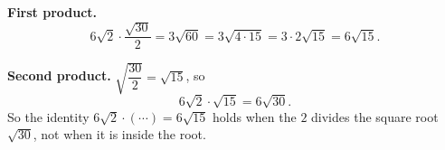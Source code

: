 \textbf{First product.}
\[6\sqrt2\cdot\dfrac{\sqrt{30}}2=3\sqrt{60}=3\sqrt{4\cdot15}=3\cdot2\sqrt{15}=6\sqrt{15}.\]

\textbf{Second product.} $\sqrt{\dfrac{30}2}=\sqrt{15}$, so
\[6\sqrt2\cdot\sqrt{15}=\boxed{6\sqrt{30}}.\]
So the identity $6\sqrt2\cdot(\cdots)=6\sqrt{15}$ holds when the $2$ divides the square root $\sqrt{30}$, not when it is inside the root.
